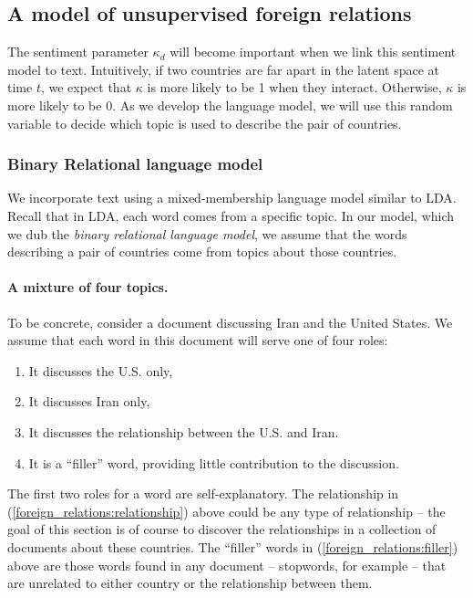 \subsection{A model of unsupervised foreign relations}

The sentiment parameter $\kappa_d$ will become important when we link
this sentiment model to text.  Intuitively, if two countries are far
apart in the latent space at time $t$, we expect that $\kappa$ is more
likely to be 1 when they interact.  Otherwise, $\kappa$ is more likely
to be 0.  As we develop the language model, we will use this random
variable to decide which topic is used to describe the pair of countries.

\subsubsection*{Binary Relational language model}
We incorporate text using a mixed-membership language model similar to
LDA.  Recall that in LDA, each word comes from a specific topic.  In
our model, which we dub the \emph{binary relational language model},
we assume that the words describing a pair of countries come from
topics about those countries.

\paragraph{A mixture of four topics.} To be concrete, consider a document discussing Iran and the United
States.  We assume that each word in this document will serve one of
four roles:
\begin{enumerate}
  \item It discusses the U.S. only,
  \item It discusses Iran only,
  \item It discusses the relationship between the U.S. and Iran. \label{foreign_relations:relationship}
  \item It is a ``filler'' word, providing little contribution to the discussion. \label{foreign_relations:filler}
\end{enumerate}
The first two roles for a word are self-explanatory.  The relationship in
(\ref{foreign_relations:relationship}) above could be any type of
relationship -- the goal of this section is of course to discover the
relationships in a collection of documents about these
countries.  The ``filler'' words in
(\ref{foreign_relations:filler}) above are those words found in any document
-- stopwords, for example -- that are unrelated to either country or
the relationship between them.


